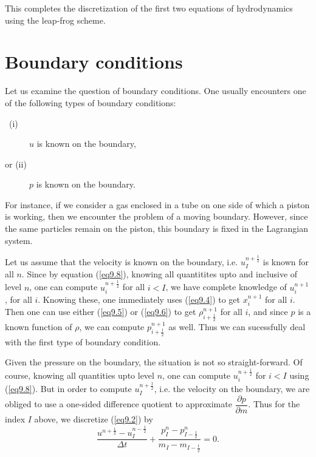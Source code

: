 This completes the discretization of the first two equations of hydrodynamics using the leap-frog scheme.

\section{Boundary conditions}\label{chap9:sec9.3}

Let us examine the question of boundary conditions. One usually encounters one of the following types of boundary conditions:
\begin{description}
\item[{\rm  \qquad \, (i)}] $u$ is known on the boundary,

\item[{\rm or \quad (ii)}] $p$ is known on the boundary.
\end{description}

For instance, if we consider a gas enclosed in a tube on one side of
which a piston is working, then we encounter the problem of a moving
boundary. However, since the same particles remain on the piston, this
boundary is fixed in the Lagrangian system. 

Let us assume that the velocity is known on the boundary,
i.e. $u^{n+\frac{1}{2}}_I$ is known for all $n$. Since by equation
(\ref{eq9.8}), knowing all quantitites upto and inclusive of level
$n$, one can compute $u^{n+\frac{1}{2}}_i$ for all $i< I$, we have
complete knowledge of $u^{n+1}_i$, for all $i$. Knowing these, one
immediately uses (\ref{eq9.4}) to get $x^{n+1}_i$ for all $i$. Then
one can use either (\ref{eq9.5}) or (\ref{eq9.6}) to get
$\rho^{n+1}_{i+\frac{1}{2}}$ for all $i$, and since $p$ is a known
function of $\rho$, we can compute $p^{n+1}_{i+\frac{1}{2}}$ as
well. Thus we can sucessfully deal with the first type of boundary
condition.


Given the pressure on the boundary, the situation is not so straight-forward. Of course, knowing all quantities upto level $n$, one can compute $u^{n+\frac{1}{2}}_i$ for $i<I$ using (\ref{eq9.8}). But in order to compute $u^{n+\frac{1}{2}}_I$, i.e. the velocity on the boundary, we are obliged to use a one-sided difference quotient to approximate $\dfrac{\partial p}{\partial m}$. Thus for the index $I$ above, we discretize (\ref{eq9.2}) by
\begin{equation*}
\frac{u^{n+\frac{1}{2}} - u^{n-\frac{1}{2}}_I}{\Delta t} + \frac{p^n_I - p^n_{I - \frac{1}{2}}}{m_I - m_{I -\frac{1}{2}}} = 0. \tag{9.9}\label{eq9.9}
\end{equation*}\pageoriginale

